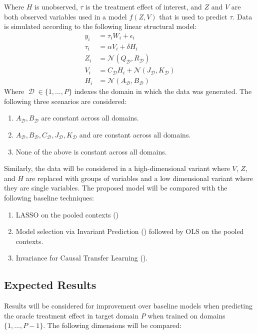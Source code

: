 \documentclass[a4paper,12pt]{article}
\DeclareMathOperator*{\D}{\mathcal{D}}
\begin{document}
Where $H$ is unobserved, $\tau$ is the treatment effect of interest, and $Z$ and $V$ are both observed variables used in a model $f(Z, V)$ that is used to predict $\tau$.
%
Data is simulated according to the following linear structural model:
%
\begin{align*}
y_i &= \tau_i W_i + \epsilon_i \\
\tau_i &= \alpha V_i + \delta H_i \\
Z_i &= \mathcal{N}(Q_{\D}, R_{\D}) \\
V_i &= C_{\D} H_i + \mathcal{N}(J_{\D}, K_{\D}) \\
H_i &= \mathcal{N}(A_{\D}, B_{\D})
\end{align*}
%
Where $\D \in \{1,...,P\}$ indexes the domain in which the data was generated. The following three scenarios are considered:

\begin{enumerate}
\item $A_{\D}, B_{\D}$ are constant across all domains.
\item $A_{\D}, B_{\D}, C_{\D}, J_{\D}, K_{\D}$ and are constant across all domains.
\item None of the above is constant across all domains.
\end{enumerate}

Similarly, the data will be considered in a high-dimensional variant where $V$, $Z$, and $H$ are replaced with groups of variables and a low dimensional variant where they are single variables. The proposed model will be compared with the following baseline techniques:

\begin{enumerate}
\item LASSO on the pooled contexts (\cite{tibshirani1996regression})
\item Model selection via Invariant Prediction (\cite{Peters2015}) followed by OLS on the pooled contexts.
\item Invariance for Causal Transfer Learning (\cite{Rojas-carulla2018}).
\end{enumerate}

\subsection{ Expected Results }

Results will be considered for improvement over baseline models when predicting the oracle treatment effect in target domain $P$ when trained on domains $\{1,...,P-1\}$. The following dimensions will be compared:
\end{document}
